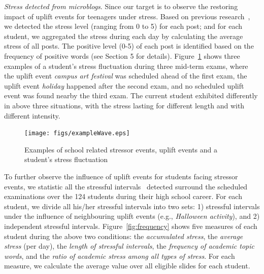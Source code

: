 \emph{Stress detected from microblogs}.
Since our target is to observe the restoring impact of uplift events for teenagers under stress.
Based on previous research~\cite{XueUbicomp13},
we detected the stress level (ranging from 0 to 5) for each post;
and for each student, we aggregated the stress during each day by calculating the average stress of all posts.
The positive level (0-5) of each post is identified based on the frequency of positive words (see Section 5 for details).
Figure~\ref{fig:example} shows three examples of a student's stress fluctuation during three mid-term exams,
where the uplift event \emph{campus art festival} was scheduled ahead of the first exam,
the uplift event \emph{holiday} happened after the second exam,
and no scheduled uplift event was found nearby the third exam.
The current student exhibited differently in above three situations, with the stress lasting for different length and with different intensity.
\begin{figure}
\centering
\caption{Examples of school related stressor events, uplift events and a student's stress fluctuation}
\texttt{[image: figs/exampleWave.eps]}
\label{fig:example}
\end{figure}


To further observe the influence of uplift events for students facing stressor events,
we statistic all the stressful intervals~\cite{Li2017Analyzing} detected surround the scheduled examinations over the 124 students during their high school career.
For each student, we divide all his/her stressful intervals into two sets:
1) stressful intervals under the influence of neighbouring uplift events (e.g., \emph{Halloween activity}), and 2) independent stressful intervals.
Figure~\ref{fig:frequency} shows five measures of each student during the above two conditions:
the \emph{accumulated stress}, the \emph{average stress} (per day), the \emph{length of stressful intervals},
the \emph{frequency of academic topic words}, and the \emph{ratio of academic stress among all types of stress}.
For each measure, we calculate the average value over all eligible slides for each student.

